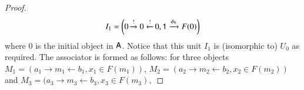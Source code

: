 \documentclass[reqno]{amsart}
\begin{document}
\begin{proof}
\begin{comment}
\[
\begin{tikzpicture}[scale=1.5]
\node (A) at (0,0) {$a_1$};
\node (B) at (1,0) {$m_1$};
\node (C) at (2,0) {$b_1$};
\node (D) at (1,-0.5) {$x_1 \in F(m_1)$};
\node (E) at (3,0) {$a_2$};
\node (F) at (4,0) {$m_2$};
\node (G) at (5,0) {$b_2$};
\node (H) at (4,-0.5) {$x_2 \in F(m_2)$};
\path[->,font=\scriptsize,>=angle 90]
(A) edge node[above]{$i_1$} (B)
(C) edge node[above]{$o_1$} (B)
(E) edge node[above]{$i_2$} (F)
(G) edge node[above]{$o_2$} (F);
\end{tikzpicture}
\]
their tensor product $M_1 \otimes M_2$ is given by taking the coproducts of the cospans in $\A$
\[
\begin{tikzpicture}[scale=1.5]
\node (A) at (0,0) {$a_1+a_2$};
\node (B) at (1.5,0) {$m_1+m_2$};
\node (C) at (3,0) {$b_1+b_2$};
\node (D) at (4.55,0) {$x_1+x_2 \in F(m_1+m_2)$};
\path[->,font=\scriptsize,>=angle 90]
(A) edge node[above]{$i_1+i_2$} (B)
(C) edge node[above]{$o_1+o_2$} (B);
\end{tikzpicture}
\]
where the decoration on the apex is obtained using the natural transformation of the symmetric lax monoidal pseudofunctor $F$: $$x_1+x_2 \mapseqq 1 \xrightarrow{\lambda^{-1}} 1 \times 1 \xrightarrow{x_1 \times x_2} F(m_1) \times F(m_2) \xrightarrow{\phi_{m_1,m_2}} F(m_1+m_2).$$
The monoidal unit $0_{F\lCsp_1}$ is given by:
\[
\begin{tikzpicture}[scale=1.5]
\node (A) at (0,0) {$0$};
\node (B) at (1,0) {$0$};
\node (C) at (2,0) {$0,$};
\node (D) at (3,0) {\bot_0 = \phi \in F(0)$};
\path[->,font=\scriptsize,>=angle 90]
(A) edge node[above]{$!$} (B)
(C) edge node[above]{$!$} (B);
\end{tikzpicture}
\]
\end{comment}
\begin{displaymath}
I_1=\left(0\xrightarrow{!}0\xleftarrow{!}0, \mathsf{1} \xrightarrow{\phi_0}F(0)\right)
\end{displaymath}
where $0$ is the initial object in $\mathsf{A}$. Notice that this unit $I_1$ is (isomorphic to) $U_0$ as required. The associator is formed as follows: for three objects
$M_1=(a_1\to m_1\leftarrow b_1,x_1\in F(m_1))$, $M_2=(a_2\to m_2\leftarrow b_2,x_2\in F(m_2))$ and $M_3=(a_3\to m_3\leftarrow b_3,x_3\in F(m_3),$

\end{proof}
\end{document}
